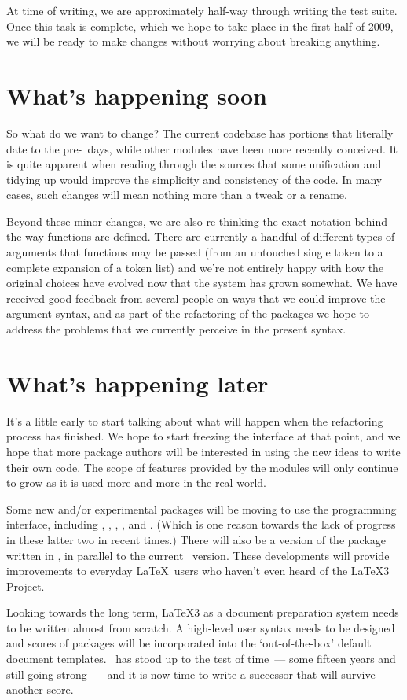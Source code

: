 \documentclass{ltnews}
\begin{document}
At time of writing, we are approximately half-way through writing the test
suite. Once this task is complete, which we hope to take place in the first
half of 2009, we will be ready to make changes without worrying about breaking
anything.

\section{What's happening soon}

So what do we want to change? The current  codebase has
portions that literally date to the pre-\LaTeXe\ days, while other modules
have been more recently conceived. It is quite apparent when reading through
the sources that some unification and tidying up would improve the simplicity
and consistency of the code. In many cases, such changes will mean nothing
more than a tweak or a rename.

Beyond these minor changes, we are also re-thinking the exact notation behind
the way functions are defined. There are currently a handful of different
types of arguments that functions may be passed (from an untouched single
token to a complete expansion of a token list) and we're not entirely happy
with how the original choices have evolved now that the system has grown
somewhat. We have received good feedback from several people on ways that we
could improve the argument syntax, and as part of the refactoring of the
 packages we hope to address the problems that we currently
perceive in the present syntax.

\section{What's happening later}

It's a little early to start talking about what will happen when the
refactoring process has finished. We hope to start freezing the interface at
that point, and we hope that more package authors will be interested in using
the new ideas to write their own code. The scope of features provided by the
 modules will only continue to grow as it is used more and more
in the real world.

Some new and/or experimental packages will be moving to use the
 programming interface, including ,
, , , and
. (Which is one reason towards the lack of progress in
these latter two in recent times.) There will also be a version of the
 package written in , in parallel to the
current \LaTeXe\ version. These developments will provide improvements to
everyday \LaTeX\ users who haven't even heard of the \LaTeX3 Project.

Looking towards the long term, \LaTeX3 as a document preparation system needs
to be written almost from scratch. A high-level user syntax needs to be
designed and scores
of packages will be incorporated into the `out-of-the-box' default document
templates. \LaTeXe\ has stood up to the test of time~--- some fifteen years
and still going strong~--- and it is now time to write a successor that will
survive another score.
\end{document}
